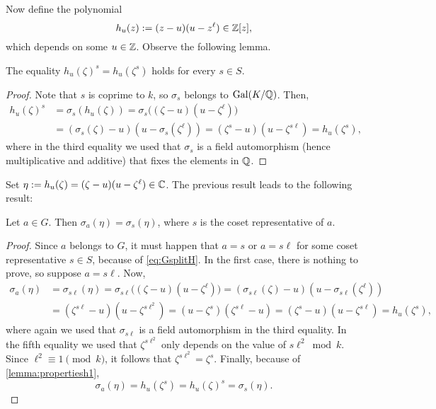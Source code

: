 \documentclass[../main.tex]{subfiles}
\begin{document}
Now define the polynomial
\begin{equation*}
	h_u(z):=(z-u)(u-z^{\ell})\in\mathbb{Z}[z], 
\end{equation*}
which depends on some $u\in\mathbb{Z}$. Observe the following lemma.
\begin{lemma}\label{lemma:propertiesh1}
	 The equality $h_u(\zeta)^s=h_u(\zeta^s)$ holds for every $s\in S$.
\end{lemma}
\begin{proof}
Note that $s$ is coprime to $k$, so $\sigma_s$ belongs to $\operatorname{Gal}(K/\mathbb{Q})$. Then,
\begin{align*}
	h_u(\zeta)^s&=\sigma_s(h_u(\zeta))=\sigma_s\big((\zeta-u)(u-\zeta^\ell)\big)\\
	&=(\sigma_s(\zeta)-u)(u-\sigma_s(\zeta^\ell))=(\zeta^s-u)(u-\zeta^{s\ell})=h_u(\zeta^s),
\end{align*}
where in the third equality we used that $\sigma_s$ is a field automorphism (hence multiplicative and additive) that fixes the elements in $\mathbb{Q}$. 
\end{proof}

Set $\eta:=h_u(\zeta)=(\zeta-u)(u-\zeta^{\ell})\in\mathbb{C}$. The previous result leads to the following result:
\begin{lemma}\label{lemma:propertiesh}
	Let $a\in G$. Then $\sigma_a(\eta)=\sigma_s(\eta)$, where $s$ is the coset representative of $a$.
\end{lemma}
\begin{proof}
	Since $a$ belongs to $G$, it must happen that $a=s$ or $a=s\ell$ for some coset representative $s\in S$, because of \cref{eq:GsplitH}. In the first case, there is nothing to prove, so suppose $a=s\ell$. Now,
	\begin{align*}
		\sigma_a(\eta)&=\sigma_{s\ell}(\eta)=\sigma_{s\ell}\big((\zeta-u)(u-\zeta^\ell)\big)=(\sigma_{s\ell}(\zeta)-u)(u-\sigma_{s\ell}(\zeta^\ell))\\
		&=(\zeta^{s\ell}-u)(u-\zeta^{s\ell^2})=(u-\zeta^{s})(\zeta^{s\ell}-u)=(\zeta^{s}-u)(u-\zeta^{s\ell})=h_u(\zeta^s),
	\end{align*}
	where again we used that $\sigma_{s\ell}$ is a field automorphism in the third equality. In the fifth equality we used that $\zeta^{s\ell^2}$ only depends on the value of $s\ell^2 \bmod{k}$. Since $\ell^2\equiv 1 \pmod{k}$, it follows that $\zeta^{s\ell^2}=\zeta^s$. Finally, because of \cref{lemma:propertiesh1}, 
	\begin{equation*}
		\sigma_a(\eta)=h_u(\zeta^s)=h_u(\zeta)^s=\sigma_s(\eta).
	\end{equation*}
\end{proof}
\end{document}
